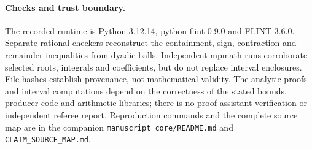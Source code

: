 \documentclass[11pt,a4paper]{article}
\numberwithin{equation}{section}
\theoremstyle{remark}\newtheorem{remark}[theorem]{Remark}
\begin{document}
\paragraph{Checks and trust boundary.}
The recorded runtime is Python 3.12.14, python-flint 0.9.0 and FLINT 3.6.0.
Separate rational checkers reconstruct the containment, sign, contraction
and remainder inequalities from dyadic balls. Independent mpmath runs
corroborate selected roots, integrals and coefficients, but do not replace
interval enclosures. File hashes establish provenance, not mathematical
validity. The analytic proofs and interval computations depend on the
correctness of the stated bounds, producer code and arithmetic libraries;
there is no proof-assistant verification or independent referee report.
Reproduction commands and the complete source map are in the companion
\texttt{manuscript\_core/README.md} and \texttt{CLAIM\_SOURCE\_MAP.md}.
\end{document}
